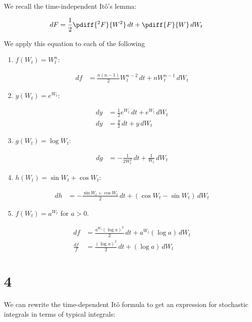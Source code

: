 \documentclass{article}
\begin{document}
	We recall the time-independent It\^o's lemma:
	
	\begin{equation*}
		dF = \frac{1}{2}\pdiff{^2F}{W^2} \, dt + \pdiff{F}{W} \, dW_t
	\end{equation*}
	
	We apply this equation to each of the following 
	
	\begin{enumerate}[label*=\alph*.]
		\item $f(W_t) = W_t^n$:
		
		\begin{align*}
			df &= \frac{n(n-1)}{2} W_t^{n-2} \, dt + nW_t^{n-1} \, dW_t
		\end{align*}
		
		\item $y(W_t) = e^{W_t}$:
		
		\begin{align*}
			dy &= \frac{1}{2}e^{W_t} \, dt + e^{W_t} \, dW_t \\
			dy &= \frac{y}{2} \, dt + y \, dW_t
		\end{align*}
		
		\item $g(W_t) = \log W_t$:
		
		\begin{align*}
			dg &= -\frac{1}{2W_t^2} \, dt + \frac{1}{W_t} \, dW_t
		\end{align*}
		
		\item $h(W_t) = \sin W_t + \cos W_t$:
		
		\begin{align*}
			dh &= -\frac{\sin W_t + \cos W_t}{2} \, dt + (\cos W_t - \sin W_t) \, dW_t
		\end{align*}
		
		\item $f(W_t) = a^{W_t}$ for $a > 0$.
		
		 \begin{align*}
		 	df &= \frac{a^{W_t}(\log a)^2}{2} \, dt + a^{W_t}(\log a) \, dW_t \\
		 	\frac{df}{f} &= \frac{(\log a)^2}{2} \, dt + (\log a) \, dW_t
		 \end{align*}
	\end{enumerate}
	
	\section*{4}
	We can rewrite the time-dependent It\^o formula to get an  expression for stochastic integrals in terms of typical integrals:
	
\end{document}
